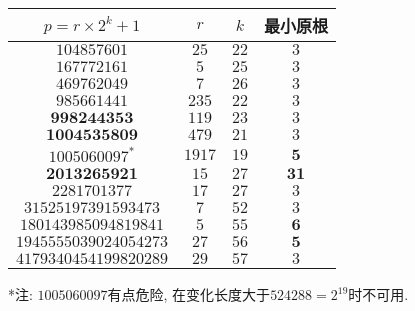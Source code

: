 \begin{tabular}{|c|c|c|c|}
	\hline $p = r \times 2 ^ k + 1$ &  $r$  & $k$  & 最小原根 \\
	\hline $104857601$              &  $25$ & $22$ & $3$ \\
	\hline $167772161$              &  $5$  & $25$ & $3$ \\
     \hline $469762049$      &  $7$   &  $26$  &    $3$ \\
     \hline $985661441$      & $235$  &  $22$  &    $3$ \\
  \hline $\mathbf{998244353}$    & $119$  &  $23$  &    $3$ \\
  \hline $\mathbf{1004535809}$    & $479$  &  $21$  &    $3$ \\
  \hline $1005060097 ^ *$      & $1917$ &  $19$  &  $\mathbf{5}$ \\
  \hline $\mathbf{2013265921}$    &  $15$  &  $27$  &  $\mathbf{31}$ \\
    \hline $2281701377$      &  $17$  &  $27$  &    $3$ \\
 \hline $31525197391593473$  &  $7$   &  $52$  &    $3$ \\
\hline $180143985094819841$  &  $5$   &  $55$  &  $\mathbf{6}$ \\
\hline $1945555039024054273$ &  $27$  &  $56$  &  $\mathbf{5}$ \\
\hline $4179340454199820289$ &  $29$  &  $57$  &    $3$ \\
\hline
\end{tabular}

*注: $1005060097$有点危险, 在变化长度大于$524288 = 2 ^ {19}$时不可用.